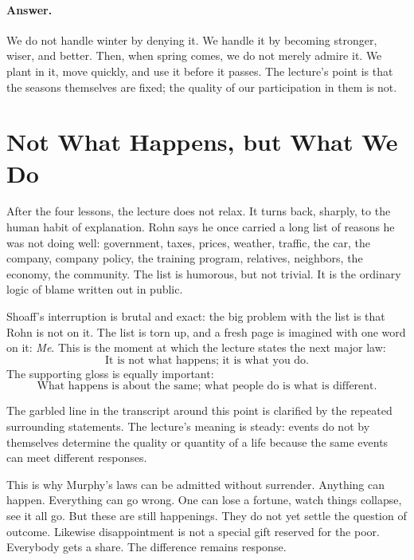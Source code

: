 \paragraph{Answer.} We do not handle winter by denying it. We handle it by becoming stronger, wiser, and better. Then, when spring comes, we do not merely admire it. We plant in it, move quickly, and use it before it passes. The lecture's point is that the seasons themselves are fixed; the quality of our participation in them is not.

\section{Not What Happens, but What We Do}

After the four lessons, the lecture does not relax. It turns back, sharply, to the human habit of explanation. Rohn says he once carried a long list of reasons he was not doing well: government, taxes, prices, weather, traffic, the car, the company, company policy, the training program, relatives, neighbors, the economy, the community. The list is humorous, but not trivial. It is the ordinary logic of blame written out in public.

Shoaff's interruption is brutal and exact: the big problem with the list is that Rohn is not on it. The list is torn up, and a fresh page is imagined with one word on it: \emph{Me}. This is the moment at which the lecture states the next major law:
\begin{equation}
\text{It is not what happens; it is what you do.}
\end{equation}
The supporting gloss is equally important:
\begin{equation}
\text{What happens is about the same; what people do is what is different.}
\end{equation}

The garbled line in the transcript around this point is clarified by the repeated surrounding statements. The lecture's meaning is steady: events do not by themselves determine the quality or quantity of a life because the same events can meet different responses.

This is why Murphy's laws can be admitted without surrender. Anything can happen. Everything can go wrong. One can lose a fortune, watch things collapse, see it all go. But these are still happenings. They do not yet settle the question of outcome. Likewise disappointment is not a special gift reserved for the poor. Everybody gets a share. The difference remains response.

